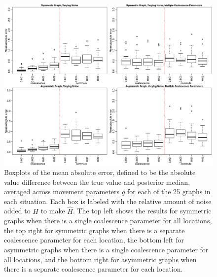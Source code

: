 \documentclass{article}
\begin{document}
\begin{figure}
\centering
\includegraphics[scale=.6]{figs/mult_noise}
\caption{Boxplots of the mean absolute error, %
defined to be the absolute value difference between the true value and posterior median,
averaged across movement parameters $g$ for each of the 25 graphs in each situation.
Each box is labeled with the relative amount of noise added to $H$ to make $\hat{H}$.
The top left shows the results for symmetric graphs 
when there is a single coalescence parameter for all locations,
the top right for symmetric graphs 
when there is a separate coalescence parameter for each location,
the bottom left for asymmetric graphs 
when there is a single coalescence parameter for all locations,
and the bottom right for asymmetric graphs 
when there is a separate coalescence parameter for each location.}
\label{fig:mult_noise}
\end{figure}
\end{document}
